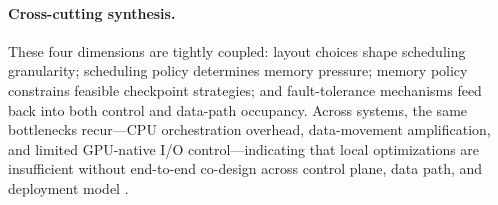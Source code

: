 \paragraph{Cross-cutting synthesis.}
These four dimensions are tightly coupled: layout choices shape scheduling granularity; scheduling policy determines memory pressure; memory policy constrains feasible checkpoint strategies; and fault-tolerance mechanisms feed back into both control and data-path occupancy. Across systems, the same bottlenecks recur---CPU orchestration overhead, data-movement amplification, and limited GPU-native I/O control---indicating that local optimizations are insufficient without end-to-end co-design across control plane, data path, and deployment model \cite{qureshi2023bam,nvidia_gds_overview,murray2021tfdata,geminifs2025}.
